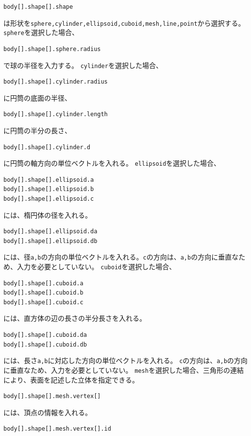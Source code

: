 \documentclass[a4paper,11pt]{jbook}
\begin{document}
\begin{verbatim}
body[].shape[].shape
\end{verbatim}
は形状を\verb|sphere,cylinder,ellipsoid,cuboid,mesh,line,point|から選択する。
\verb|sphere|を選択した場合、
\begin{verbatim}
body[].shape[].sphere.radius
\end{verbatim}
で球の半径を入力する。\newline
\verb|cylinder|を選択した場合、
\begin{verbatim}
body[].shape[].cylinder.radius
\end{verbatim}
に円筒の底面の半径、
\begin{verbatim}
body[].shape[].cylinder.length
\end{verbatim}
に円筒の半分の長さ、
\begin{verbatim}
body[].shape[].cylinder.d
\end{verbatim}
に円筒の軸方向の単位ベクトルを入れる。\newline
\verb|ellipsoid|を選択した場合、
\begin{verbatim}
body[].shape[].ellipsoid.a
body[].shape[].ellipsoid.b
body[].shape[].ellipsoid.c
\end{verbatim}
には、楕円体の径を入れる。
\begin{verbatim}
body[].shape[].ellipsoid.da
body[].shape[].ellipsoid.db
\end{verbatim}
には、径\verb|a,b|の方向の単位ベクトルを入れる。\verb|c|の方向は、\verb|a,b|の方向に垂直なため、入力を必要としていない。\newline
\verb|cuboid|を選択した場合、
\begin{verbatim}
body[].shape[].cuboid.a
body[].shape[].cuboid.b
body[].shape[].cuboid.c
\end{verbatim}
には、直方体の辺の長さの半分長さを入れる。
\begin{verbatim}
body[].shape[].cuboid.da
body[].shape[].cuboid.db
\end{verbatim}
には、長さ\verb|a,b|に対応した方向の単位ベクトルを入れる。
\verb|c|の方向は、\verb|a,b|の方向に垂直なため、入力を必要としていない。
\newline
\verb|mesh|を選択した場合、三角形の連結により、表面を記述した立体を指定できる。
\begin{verbatim}
body[].shape[].mesh.vertex[]
\end{verbatim}
には、頂点の情報を入れる。
\begin{verbatim}
body[].shape[].mesh.vertex[].id
\end{verbatim}
\end{document}
